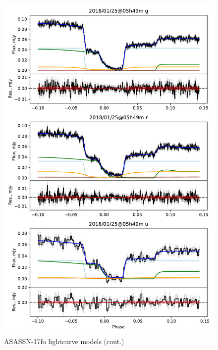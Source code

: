 \begin{figure}
    \centering
    \includegraphics[width=\textwidth]{figures/results/ASASSN-17fo/ASASSN-17fo_2.pdf}
    \caption{ASASSN-17fo lightcurve models (cont.)}
    \label{fig:ASASSN-17fo all lightcurves cont 1}
\end{figure}
